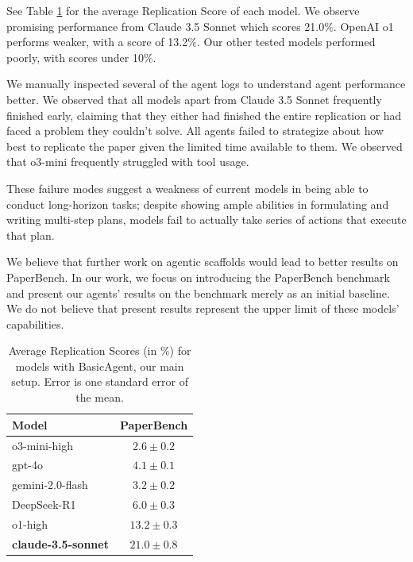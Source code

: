 \documentclass{article}
\theoremstyle{plain}
\theoremstyle{definition}
\theoremstyle{remark}
\begin{document}
See Table \ref{tab:main-experiment-results} for the average Replication Score of each model. We observe promising performance from Claude 3.5 Sonnet which scores 21.0\%. OpenAI o1 performs weaker, with a score of 13.2\%. Our other tested models performed poorly, with scores under 10\%.

We manually inspected several of the agent logs to understand agent performance better. We observed that all models apart from Claude 3.5 Sonnet frequently finished early, claiming that they either had finished the entire replication or had faced a problem they couldn't solve. All agents failed to strategize about how best to replicate the paper given the limited time available to them. We observed that o3-mini frequently struggled with tool usage.

These failure modes suggest a weakness of current models in being able to conduct long-horizon tasks; despite showing ample abilities in formulating and writing multi-step plans, models fail to actually take series of actions that execute that plan.

We believe that further work on agentic scaffolds would lead to better results on PaperBench. In our work, we focus on introducing the PaperBench benchmark and present our agents' results on the benchmark merely as an initial baseline. We do not believe that present results represent the upper limit of these models' capabilities.

\begin{table}[htb]
\caption{Average Replication Scores (in \%) for models with BasicAgent, our main setup. Error is one standard error of the mean.}
\label{tab:main-experiment-results}
\vskip 0.15in
\begin{center}
\begin{small}
\begin{sc}
\begin{tabular}{lc}
\toprule
\textbf{Model} & \textbf{PaperBench} \\
\midrule
o3-mini-high & $2.6 \pm 0.2$ \\
gpt-4o & $4.1 \pm 0.1$ \\
gemini-2.0-flash & $3.2 \pm 0.2$ \\
DeepSeek-R1 & $6.0 \pm 0.3$ \\
o1-high & $13.2 \pm 0.3$ \\
\textbf{claude-3.5-sonnet} & \textbf{$21.0 \pm 0.8$} \\
\bottomrule
\end{tabular}
\end{sc}
\end{small}
\end{center}
\vskip -0.1in
\end{table}
\end{document}
